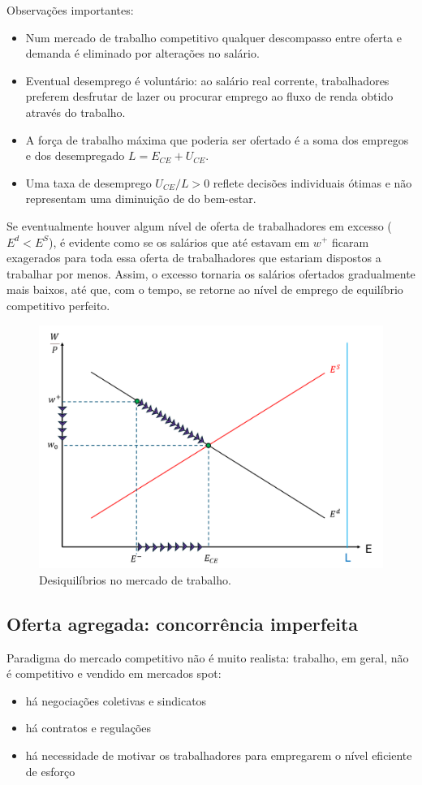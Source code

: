\documentclass[a4paper,12pt]{article}[abntex2]
\begin{document}
Observações importantes:\begin{itemize}
    \item Num mercado de trabalho competitivo qualquer descompasso entre oferta e demanda é eliminado por alterações no salário.
    \item Eventual desemprego é voluntário: ao salário real corrente, trabalhadores preferem desfrutar de lazer ou procurar emprego ao fluxo de renda obtido através do trabalho.
    \item A força de trabalho máxima que poderia ser ofertado é a soma dos empregos e dos desempregado \(L=E_{CE}+U_{CE}\).
    \item Uma taxa de desemprego \(U_{CE}/L>0\) reflete decisões individuais ótimas e não representam uma diminuição de do bem-estar.
\end{itemize}

Se eventualmente houver algum nível de oferta de trabalhadores em excesso (\(E^d<E^S\)), é evidente como se os salários que até estavam em \(w^+\) ficaram exagerados para toda essa oferta de trabalhadores que estariam dispostos a trabalhar por menos. Assim, o excesso tornaria os salários ofertados gradualmente mais baixos, até que, com o tempo, se retorne ao nível de emprego de equilíbrio competitivo perfeito.
\begin{figure}[H]
    \centering
    \caption{Desiquilíbrios no mercado de trabalho.}
    \includegraphics[width=0.7\linewidth]{Imagens/a5i7.png}
\end{figure}

\subsection{\textbf{Oferta agregada: concorrência imperfeita}}

Paradigma do mercado competitivo não é muito realista: trabalho, em geral, não é competitivo e vendido em mercados spot:\begin{itemize}
    \item há negociações coletivas e sindicatos
    \item há contratos e regulações
    \item há necessidade de motivar os trabalhadores para empregarem o nível eficiente de esforço
\end{itemize}
\end{document}
